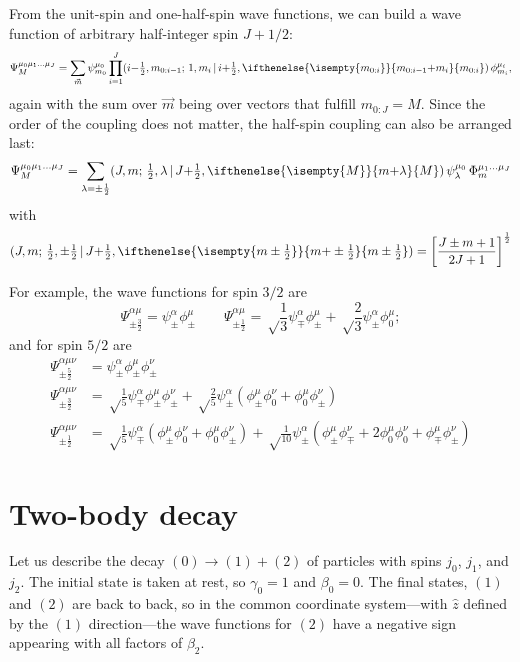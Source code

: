 \documentclass[a4paper]{article}
\newcommand{\decay}[2]{\ensuremath{#1 \to #2}}
\newcommand{\cg}[6]{(#1, #2;\, #3, #4\, |\, #5, \ifthenelse{\isempty{#6}}{#2{+}#4}{#6})}
\begin{document}
From the unit-spin and one-half-spin wave functions, we can build a
wave function of arbitrary half-integer spin $J+1/2$:
\begin{equation}
  \Psi^{\mu_0\mu_1\dots\mu_J}_M = 
  \sum_{\vec{m}} \psi^{\mu_0}_{m_0}\prod_{i=1}^{J} \cg{i{-}\tfrac{1}{2}}{m_{0:i{-}1}}{1}{m_i}{i{+}\tfrac{1}{2}}{m_{0:i}}\, \phi^{\mu_i}_{m_i},
\end{equation}
again with the sum over $\vec m$ being over vectors that fulfill
$m_{0:J} = M$.  Since the order of the coupling does not matter, the
half-spin coupling can also be arranged last:
\begin{equation}
  \Psi^{\mu_0\mu_1\dots\mu_J}_M = \sum_{\lambda=\pm\frac{1}{2}} \cg{J}{m}{\tfrac{1}{2}}{\lambda}{J{+}\tfrac{1}{2}}{M}\, \psi^{\mu_0}_{\lambda}\, \Phi_{m}^{\mu_1\dots\mu_J}
\end{equation}
with
\begin{equation}
  \cg{J}{m}{\tfrac{1}{2}}{\pm\tfrac{1}{2}}{J{+}\tfrac{1}{2}}{m\pm\tfrac{1}{2}} = \left[\frac{J\pm m +1}{2J+1}\right]^{\frac{1}{2}}
\end{equation}

For example, the wave functions for spin $3/2$ are
\begin{equation}
  \Psi^{\alpha\mu}_{\pm\frac{3}{2}} = \psi^\alpha_\pm \phi^\mu_\pm \qquad
  \Psi^{\alpha\mu}_{\pm\frac{1}{2}} = \sqrt\frac{1}{3} \psi^\alpha_\mp\phi^\mu_\pm + \sqrt\frac{2}{3} \psi^\alpha_\pm\phi^\mu_0;
\end{equation}
and for spin $5/2$ are
\begin{align}
  \Psi^{\alpha\mu\nu}_{\pm\frac{5}{2}} & = \psi^\alpha_\pm \phi^\mu_\pm \phi^\nu_\pm \\
  \Psi^{\alpha\mu\nu}_{\pm\frac{3}{2}} & = \sqrt\frac{1}{5} \psi^\alpha_\mp \phi^\mu_\pm \phi^\nu_\pm + \sqrt\frac{2}{5} \psi^\alpha_\pm (\phi^\mu_\pm \phi^\nu_0 + \phi^\mu_0 \phi^\nu_\pm) \\
  \Psi^{\alpha\mu\nu}_{\pm\frac{1}{2}} & = \sqrt\frac{1}{5} \psi^\alpha_\mp  (\phi^\mu_\pm \phi^\nu_0 + \phi^\mu_0 \phi^\nu_\pm)
  + \sqrt\frac{1}{10} \psi^\alpha_\pm (\phi^\mu_\pm \phi^\nu_\mp + 2\phi^\mu_0 \phi^\nu_0 + \phi^\mu_\mp\phi^\nu_\pm)
\end{align}

\section{Two-body decay}

Let us describe the decay \decay{(0)}{(1)+(2)} of particles with spins
$j_{0}$, $j_{1}$, and $j_{2}$. The initial state is taken at
rest, so $\gamma_{0} = 1$ and $\beta_{0} = 0$. The final states,
$(1)$ and $(2)$ are back to back, so in the common coordinate
system---with $\hat{z}$ defined by the $(1)$ direction---the wave
functions for $(2)$ have a negative sign appearing with all factors of
$\beta_{2}$.
\end{document}
